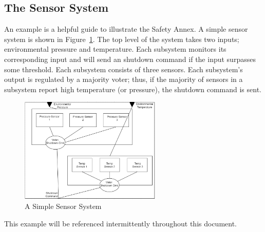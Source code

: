 \subsection{The Sensor System}
\label{sec:sensorExample}
An example is a helpful guide to illustrate the Safety Annex. A simple sensor system is shown in Figure~\ref{fig:sensorSys}. The top level of the system takes two inputs; environmental pressure and temperature. Each subsystem monitors its corresponding input and will send an shutdown command if the input surpasses some threshold. Each subsystem consists of three sensors. Each subsystem's output is regulated by a majority voter; thus, if the majority of sensors in a subsystem report high temperature (or pressure), the shutdown command is sent. 

\begin{figure}[h]
	\centering
	\includegraphics[width=0.6\textwidth]{images/two_sensors.PNG}
	\caption{A Simple Sensor System}
	\label{fig:sensorSys}
\end{figure}

This example will be referenced intermittently throughout this document.  

